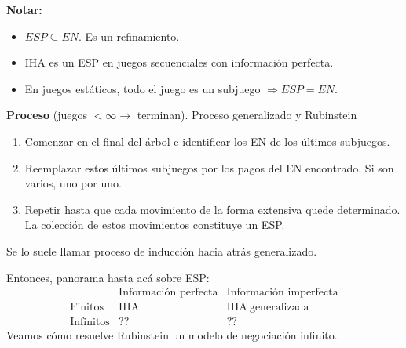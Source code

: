 \documentclass[11pt,a4paper]{article}
\makeatletter
\renewcommand\subsection{\@startsection{subsection}{2}{\z@}{-0.7em}{0.25em}
 {\normalfont\normalsize\bfseries\color{inkred}}}
\newcommand{\rojo}[1]{\textcolor{inkred}{#1}}
\makeatother
\begin{document}
\textbf{Notar:}
\begin{itemize}\item $ESP\subseteq EN$. Es un refinamiento.\item IHA es un ESP en juegos secuenciales con información perfecta.\item En juegos estáticos, todo el juego es un subjuego $\Rightarrow ESP=EN$.\end{itemize}
\rojo{\textbf{Proceso}} (juegos $<\infty\longrightarrow$ terminan).
\subsection{Proceso generalizado y Rubinstein}
\begin{enumerate}\item Comenzar en el final del árbol e identificar los EN de los últimos subjuegos.\item Reemplazar estos últimos subjuegos por los pagos del EN encontrado. Si son varios, uno por uno.\item Repetir hasta que cada movimiento de la forma extensiva quede determinado. La colección de estos movimientos constituye un ESP.\end{enumerate}
Se lo suele llamar \rojo{proceso de inducción hacia atrás generalizado}.

Entonces, panorama hasta acá sobre ESP:
\[\begin{array}{c|cc}&\text{Información perfecta}&\text{Información imperfecta}\\\hline\text{Finitos}&\mathrm{IHA}&\mathrm{IHA\ generalizada}\\\text{Infinitos}&??&??\end{array}\]
Veamos cómo resuelve \rojo{Rubinstein} un modelo de negociación \rojo{infinito}.
\end{document}
